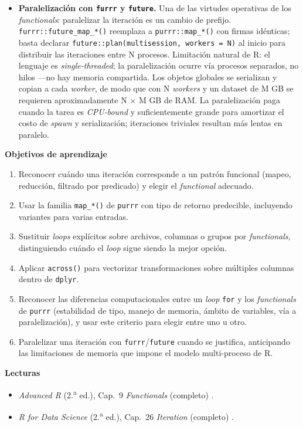 \documentclass[11pt,letterpaper]{article}
\newcommand{\blue}[1]{{\color{cerulean}#1}}
\newcommand{\orange}[1]{{\color{redorange}#1}}
\begin{document}
\begin{itemize}[leftmargin=*, itemsep=2pt]
    \item \textbf{Paralelización con \texttt{furrr} y \texttt{future}.} Una de las virtudes operativas de los \textit{functionals}: paralelizar la iteración es \blue{un cambio de prefijo}. \texttt{furrr::future\_map\_*()} reemplaza a \texttt{purrr::map\_*()} con firmas idénticas; basta declarar \texttt{future::plan(multisession, workers = N)} al inicio para distribuir las iteraciones entre N procesos. \orange{Limitación natural de R:} el lenguaje es \textit{single-threaded}; la paralelización ocurre vía procesos separados, no hilos ---no hay memoria compartida. Los objetos globales se serializan y copian a cada \textit{worker}, de modo que con N \textit{workers} y un dataset de M GB se requieren aproximadamente N $\times$ M GB de RAM. La paralelización paga cuando la tarea es \textit{CPU-bound} y suficientemente grande para amortizar el costo de \textit{spawn} y serialización; iteraciones triviales resultan más lentas en paralelo.
\end{itemize}

\medskip
\noindent\textbf{Objetivos de aprendizaje}
\begin{enumerate}[leftmargin=*, itemsep=1pt]
    \item Reconocer cuándo una iteración corresponde a un patrón funcional (mapeo, reducción, filtrado por predicado) y elegir el \textit{functional} adecuado.
    \item Usar la familia \texttt{map\_*()} de \texttt{purrr} con tipo de retorno predecible, incluyendo variantes para varias entradas.
    \item Sustituir \textit{loops} explícitos sobre archivos, columnas o grupos por \textit{functionals}, distinguiendo cuándo el \textit{loop} sigue siendo la mejor opción.
    \item Aplicar \texttt{across()} para vectorizar transformaciones sobre múltiples columnas dentro de \texttt{dplyr}.
    \item Reconocer las diferencias computacionales entre un \textit{loop} \texttt{for} y los \textit{functionals} de \texttt{purrr} (estabilidad de tipo, manejo de memoria, ámbito de variables, vía a paralelización), y usar este criterio para elegir entre uno u otro.
    \item Paralelizar una iteración con \texttt{furrr}/\texttt{future} cuando se justifica, anticipando las limitaciones de memoria que impone el modelo multi-proceso de R.
\end{enumerate}

\medskip
\noindent\textbf{Lecturas}
\begin{itemize}[leftmargin=*, itemsep=1pt]
    \item \textit{Advanced R} (2.\textsuperscript{a} ed.), Cap.\ 9 \textit{Functionals} (completo) \cite{wickham2019advr}.
    \item \textit{R for Data Science} (2.\textsuperscript{a} ed.), Cap.\ 26 \textit{Iteration} (completo) \cite{wickham2023r4ds}.
\end{itemize}
\end{document}

